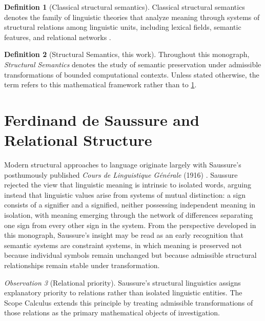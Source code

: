\documentclass[11pt,twoside,openright]{book}
\numberwithin{equation}{chapter}
\theoremstyle{definition}
\newtheorem{definition}{Definition}[chapter]
\theoremstyle{plain}
\theoremstyle{remark}
\newtheorem{observation}[definition]{Observation}
\theoremstyle{definition}
\begin{document}
\begin{definition}[Classical structural semantics]
\label{def:classical-structural-semantics}
Classical structural semantics denotes the family of linguistic theories
that analyze meaning through systems of structural relations among
linguistic units, including lexical fields, semantic features, and
relational networks \cite{Saussure1916,Hjelmslev1961,Greimas1966,Lyons1977}.
\end{definition}

\begin{definition}[Structural Semantics, this work]
Throughout this monograph, \emph{Structural Semantics} denotes the study
of semantic preservation under admissible transformations of bounded
computational contexts. Unless stated otherwise, the term refers to this
mathematical framework rather than to \cref{def:classical-structural-semantics}.
\end{definition}

\section{Ferdinand de Saussure and Relational Structure}

Modern structural approaches to language originate largely with
Saussure's posthumously published \emph{Cours de Linguistique
G\'en\'erale} (1916) \cite{Saussure1916}. Saussure rejected the view that
linguistic meaning is intrinsic to isolated words, arguing instead that
linguistic values arise from systems of mutual distinction: a sign
consists of a signifier and a signified, neither possessing independent
meaning in isolation, with meaning emerging through the network of
differences separating one sign from every other sign in the system. From
the perspective developed in this monograph, Saussure's insight may be
read as an early recognition that semantic systems are constraint
systems, in which meaning is preserved not because individual symbols
remain unchanged but because admissible structural relationships remain
stable under transformation.

\begin{observation}[Relational priority]
Saussure's structural linguistics assigns explanatory priority to
relations rather than isolated linguistic entities. The Scope Calculus
extends this principle by treating admissible transformations of those
relations as the primary mathematical objects of investigation.
\end{observation}
\end{document}
